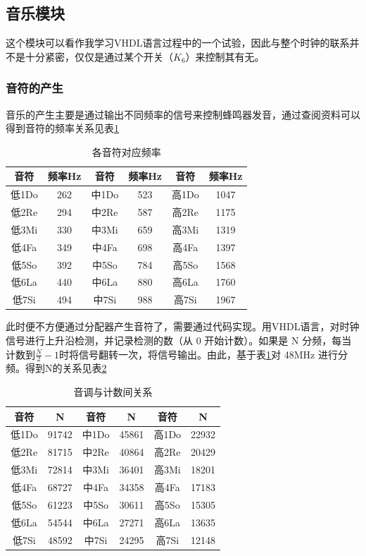 \documentclass[12pt]{article}
\begin{document}
\subsection{音乐模块}
这个模块可以看作我学习VHDL语言过程中的一个试验，因此与整个时钟的联系并不是十分紧密，仅仅是通过某个开关（$K_6$）来控制其有无。\par
\subsubsection{音符的产生}
音乐的产生主要是通过输出不同频率的信号来控制蜂鸣器发音，通过查阅资料可以得到音符的频率关系见表\ref{tab:yinfu}\par
\begin{table}[htbp]
  \centering
  \caption{各音符对应频率}
    \begin{tabular}{cccccc}
    \hline
    音符 & 频率Hz & 音符 & 频率Hz & 音符 & 频率Hz \\
    \hline
    低1Do & 262 & 中1Do & 523 & 高1Do & 1047 \\
    低2Re & 294 & 中2Re & 587 & 高2Re & 1175 \\
    低3Mi & 330 & 中3Mi & 659 & 高3Mi & 1319 \\
    低4Fa & 349 & 中4Fa & 698 & 高4Fa & 1397 \\
    低5So & 392 & 中5So & 784 & 高5So & 1568 \\
    低6La & 440 & 中6La & 880 & 高6La & 1760 \\
    低7Si & 494 & 中7Si & 988 & 高7Si & 1967 \\
    \hline
    \end{tabular}%
  \label{tab:yinfu}%
\end{table}%
此时便不方便通过分配器产生音符了，需要通过代码实现。用VHDL语言，对时钟信号进行上升沿检测，并记录检测的数（从 0 开始计数）。如果是 N 分频，每当计数到$\frac{N}{2}-1$时将信号翻转一次，将信号输出。由此，基于表\ref{tab:yinfu}对 48MHz 进行分频。得到N的关系见表\ref{tab:yinfu2}
\begin{table}[htbp]
  \centering
  \caption{音调与计数间关系}
    \begin{tabular}{cccccc}
        \hline
    音符 & N & 音符 & N & 音符 & N \\
        \hline
    低1Do & 91742 & 中1Do & 45861 & 高1Do & 22932 \\
    低2Re & 81715 & 中2Re & 40864 & 高2Re & 20429 \\
    低3Mi & 72814 & 中3Mi & 36401 & 高3Mi & 18201 \\
    低4Fa & 68727 & 中4Fa & 34358 & 高4Fa & 17183 \\
    低5So & 61223 & 中5So & 30611 & 高5So & 15305 \\
    低6La & 54544 & 中6La & 27271 & 高6La & 13635 \\
    低7Si & 48592 & 中7Si & 24295 & 高7Si & 12148 \\
        \hline
    \end{tabular}%
  \label{tab:yinfu2}%
\end{table}%
\end{document}
